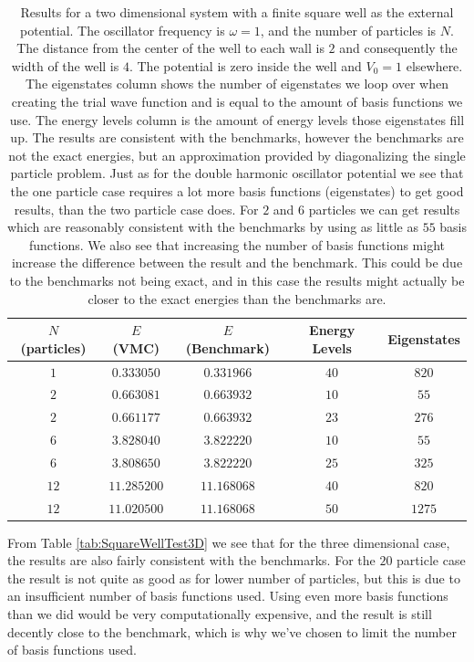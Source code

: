 \documentclass[../main.tex]{subfiles}
\begin{document}
\begin{table}[!ht]
  \centering
  \begin{tabular}{ | c | c | c | c | c | }
    \hline
    $N$ (particles) & $E$ (VMC) & $E$ (Benchmark) &  Energy Levels & Eigenstates\\*
    \hline
    $1$ & $0.333050$ & $0.331966$ & $40$ & $820$ \\*
    \hline
    $2$ & $0.663081$ & $0.663932$ & $10$ & $55$ \\*
    \hline
    $2$ & $0.661177$ & $0.663932$ & $23$ & $276$ \\*
    \hline
    $6$ & $3.828040$ & $3.822220$ & $10$ & $55$ \\*
    \hline
    $6$ & $3.808650$ & $3.822220$ & $25$ & $325$ \\*
    \hline
    $12$ & $11.285200$ & $11.168068$ & $40$ & $820$ \\*
    \hline
    $12$ & $11.020500$ & $11.168068$ & $50$ & $1275$ \\*
    \hline
  \end{tabular}
  \caption{Results for a two dimensional system with a finite square well as the external potential. The oscillator frequency is $\omega = 1$, and the number of particles is $N$. The distance from the center of the well to each wall is $2$ and consequently the width of the well is $4$. The potential is zero inside the well and $V_0 = 1$ elsewhere. The eigenstates column shows the number of eigenstates we loop over when creating the trial wave function and is equal to the amount of basis functions we use. The energy levels column is the amount of energy levels those eigenstates fill up. The results are consistent with the benchmarks, however the benchmarks are not the exact energies, but an approximation provided by diagonalizing the single particle problem. Just as for the double harmonic oscillator potential we see that the one particle case requires a lot more basis functions (eigenstates) to get good results, than the two particle case does. For $2$ and $6$ particles we can get results which are reasonably consistent with the benchmarks by using as little as $55$ basis functions. We also see that increasing the number of basis functions might increase the difference between the result and the benchmark. This could be due to the benchmarks not being exact, and in this case the results might actually be closer to the exact energies than the benchmarks are.}
  \label{tab:SquareWellTest2D}
\end{table}

From Table \ref{tab:SquareWellTest3D} we see that for the three dimensional case, the results are also fairly consistent with the benchmarks. For the $20$ particle case the result is not quite as good as for lower number of particles, but this is due to an insufficient number of basis functions used. Using even more basis functions than we did would be very computationally expensive, and the result is still decently close to the benchmark, which is why we've chosen to limit the number of basis functions used.
\end{document}

